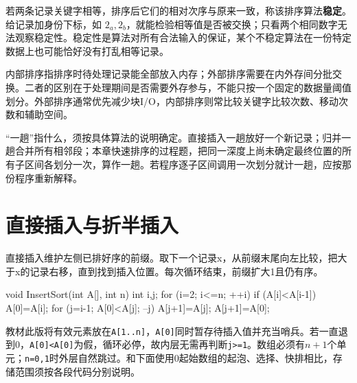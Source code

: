 \begin{definition}[排序稳定性]

若两条记录关键字相等，排序后它们的相对次序与原来一致，称该排序算法\textbf{稳定}。给记录加身份下标，如 \(2_a,2_b\)，就能检验相等值是否被交换；只看两个相同数字无法观察稳定性。稳定性是算法对所有合法输入的保证，某个不稳定算法在一份特定数据上也可能恰好没有打乱相等记录。

\end{definition}

内部排序指排序时待处理记录能全部放入内存；外部排序需要在内外存间分批交换。二者的区别在于处理期间是否需要外存参与，不能只按一个固定的数据量阈值划分。外部排序通常优先减少块I/O，内部排序则常比较关键字比较次数、移动次数和辅助空间。

``一趟''指什么，须按具体算法的说明确定。直接插入一趟放好一个新记录；归并一趟合并所有相邻段；本章快速排序的过程题，把同一深度上尚未确定最终位置的所有子区间各划分一次，算作一趟。若程序逐子区间调用一次划分就计一趟，应按那份程序重新解释。

\section{直接插入与折半插入}\label{DS08-02}

直接插入维护左侧已排好序的前缀。取下一个记录x，从前缀末尾向左比较，把大于x的记录右移，直到找到插入位置。每次循环结束，前缀扩大1且仍有序。

\par\medskip\noindent\begin{minipage}{\linewidth}
\begin{codeblock}[language=C++]
void InsertSort(int A[], int n) {
    int i,j;
    for (i=2; i<=n; ++i)
        if (A[i]<A[i-1]) {
            A[0]=A[i];
            for (j=i-1; A[0]<A[j]; --j)
                A[j+1]=A[j];
            A[j+1]=A[0];
        }
}
\end{codeblock}
\end{minipage}\par\medskip

教材此版将有效元素放在\texttt{A[\allowbreak{}1.\allowbreak{}.\allowbreak{}n]\allowbreak{}}，\texttt{A[\allowbreak{}0]\allowbreak{}}同时暂存待插入值并充当哨兵。若一直退到0，\texttt{A[\allowbreak{}0]\allowbreak{}<\allowbreak{}A[\allowbreak{}0]\allowbreak{}}为假，循环必停，故内层无需再判断\texttt{j>\allowbreak{}=\allowbreak{}1}。数组必须有\(n+1\)个单元；\texttt{n=\allowbreak{}0,\allowbreak{}1}时外层自然跳过。和下面使用0起始数组的起泡、选择、快排相比，存储范围须按各段代码分别说明。

